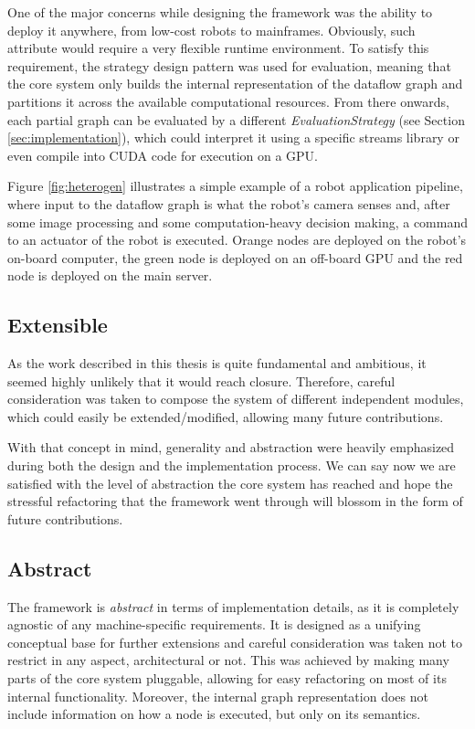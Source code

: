 \documentclass[sigplan,review,anonymous]{acmart}
\begin{document}
One of the major concerns while designing the framework was the ability to
deploy it anywhere, from low-cost robots to mainframes. Obviously, such
attribute would require a very flexible runtime environment. To satisfy this
requirement, the strategy design pattern was used for evaluation, meaning that
the core system only builds the internal representation of the dataflow graph
and partitions it across the available computational resources. From there
onwards, each partial graph can be evaluated by a different
\textit{EvaluationStrategy} (see Section \ref{sec:implementation}), which could
interpret it using a specific streams library or even compile into CUDA code for
execution on a GPU.

Figure \ref{fig:heterogen} illustrates a simple example of a robot application
pipeline, where input to the dataflow graph is what the robot's camera senses
and, after some image processing and some computation-heavy decision making, a
command to an actuator of the robot is executed. Orange nodes are deployed on
the robot's on-board computer, the green node is deployed on an off-board GPU
and the red node is deployed on the main server.


\subsection{Extensible}

As the work described in this thesis is quite fundamental and ambitious, it
seemed highly unlikely that it would reach closure. Therefore, careful
consideration was taken to compose the system of different independent modules,
which could easily be extended/modified, allowing many future contributions.

With that concept in mind, generality and abstraction were heavily emphasized
during both the design and the implementation process. We can say now we are
satisfied with the level of abstraction the core system has reached and hope the
stressful refactoring that the framework went through will blossom in the form
of future contributions.

\subsection{Abstract}

The framework is \textit{abstract} in terms of implementation details, as it is
completely agnostic of any machine-specific requirements. It is designed as a
unifying conceptual base for further extensions and careful consideration was
taken not to restrict in any aspect, architectural or not. This was achieved by
making many parts of the core system pluggable, allowing for easy refactoring on
most of its internal functionality. Moreover, the internal graph representation
does not include information on how a node is executed, but only on its
semantics.
\end{document}
